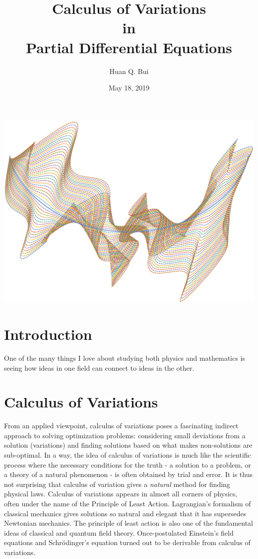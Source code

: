 \documentclass{article}
\title{Calculus of Variations\\in\\Partial Differential Equations}
\author{Huan Q. Bui}
\date{May 18, 2019}
\begin{document}
\maketitle
\begin{center}
\includegraphics[scale=0.55,angle=270]{intro.eps}\\
\end{center}



\newpage
\tableofcontents
\newpage
{}

\section{Introduction}

One of the many things I love about studying both physics and mathematics is seeing how ideas in one field can connect to ideas in the other. 



\section{Calculus of Variations}

From an applied viewpoint, calculus of variations poses a fascinating indirect approach to solving optimization problems: considering small deviations from a solution (variations) and finding solutions based on what makes non-solutions are sub-optimal. In a way, the idea of calculus of variations is much like the scientific process where the necessary conditions for the truth - a solution to a problem, or a theory of a natural phenomenon - is often obtained by trial and error. It is thus not surprising that calculus of variation gives a \textit{natural} method for finding physical laws. Calculus of variations appears in almost all corners of physics, often under the name of the Principle of Least Action. Lagrangian's formalism of classical mechanics gives solutions so natural and elegant that it has supersedes Newtonian mechanics. The principle of least action is also one of the fundamental ideas of classical and quantum field theory. Once-postulated Einstein's field equations and Schr\"{o}dinger's equation turned out to be derivable from calculus of variations.   
\end{document}

